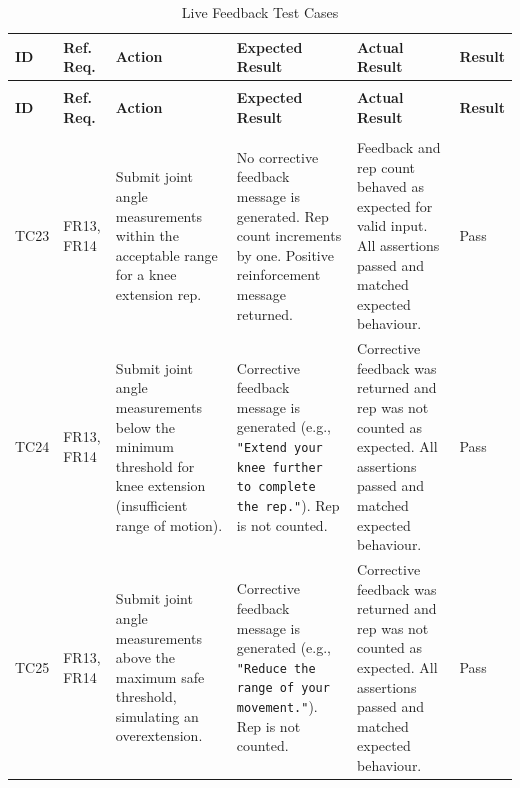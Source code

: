 \documentclass[12pt, titlepage]{article}
\begin{document}
\begin{longtable}{
  >{\centering\arraybackslash}p{1.2cm}
  >{\raggedright\arraybackslash}p{1.8cm}
  >{\raggedright\arraybackslash}p{3.0cm}
  >{\raggedright\arraybackslash}p{3.0cm}
  >{\raggedright\arraybackslash}p{3.0cm}
  >{\centering\arraybackslash}p{1.3cm}
}
	\toprule
	\textbf{ID} & \textbf{Ref. Req.} & \textbf{Action} &
	\textbf{Expected Result} & \textbf{Actual Result} & \textbf{Result} \\
	\midrule
	\endfirsthead
	
	\multicolumn{6}{l}{\textit{(Continued from previous page)}} \\
	\toprule
	\textbf{ID} & \textbf{Ref. Req.} & \textbf{Action} &
	\textbf{Expected Result} & \textbf{Actual Result} & \textbf{Result} \\
	\midrule
	\endhead
	
	\multicolumn{6}{r}{\textit{Continued on next page}} \\
	\endfoot
	
	\bottomrule
	\caption{Live Feedback Test Cases}
	\label{table:live_feedback_tests}
	\endlastfoot
	
	TC23 & FR13, FR14 & Submit joint angle measurements within the acceptable range for a knee extension rep. &
  No corrective feedback message is generated. Rep count increments by one. Positive reinforcement message returned. &
  Feedback and rep count behaved as expected for valid input. All assertions passed and matched expected behaviour. & \cellcolor{green} Pass \\ \midrule

  TC24 & FR13, FR14 & Submit joint angle measurements below the minimum threshold for knee extension (insufficient range of motion). &
  Corrective feedback message is generated (e.g., \texttt{"Extend your knee further to complete the rep."}). Rep is not counted. &
  Corrective feedback was returned and rep was not counted as expected. All assertions passed and matched expected behaviour. & \cellcolor{green} Pass \\ \midrule

  TC25 & FR13, FR14 & Submit joint angle measurements above the maximum safe threshold, simulating an overextension. &
  Corrective feedback message is generated (e.g., \texttt{"Reduce the range of your movement."}). Rep is not counted. &
  Corrective feedback was returned and rep was not counted as expected. All assertions passed and matched expected behaviour. & \cellcolor{green} Pass \\ \midrule


\end{longtable}
\end{document}
